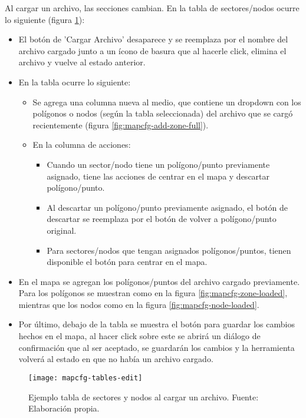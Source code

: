 Al cargar un archivo, las secciones cambian. En la tabla de sectores/nodos ocurre lo siguiente (figura \ref{fig:mapcfg-tables-edit-exameple}):

\begin{itemize}
    \item El botón de 'Cargar Archivo' desaparece y se reemplaza por el nombre del archivo cargado junto a un ícono de basura que al hacerle click, elimina el archivo y vuelve al estado anterior.
    \item En la tabla ocurre lo siguiente:
    \begin{itemize}
        \item Se agrega una columna nueva al medio, que contiene un dropdown con los polígonos o nodos (según la tabla seleccionada) del archivo que se cargó recientemente (figura \ref{fig:mapcfg-add-zone-full}).
        \item En la columna de acciones:
        \begin{itemize}        
            \item Cuando un sector/nodo tiene un polígono/punto previamente asignado, tiene las acciones de centrar en el mapa y descartar polígono/punto.
            \item Al descartar un polígono/punto previamente asignado, el botón de descartar se reemplaza por el botón de volver a polígono/punto original.
            \item Para sectores/nodos que tengan asignados polígonos/puntos, tienen disponible el botón para centrar en el mapa.
        \end{itemize}
    \end{itemize}
    \item En el mapa se agregan los polígonos/puntos del archivo cargado previamente. Para los polígonos se muestran como en la figura \ref{fig:mapcfg-zone-loaded}, mientras que los nodos como en la figura \ref{fig:mapcfg-node-loaded}.
    \item Por último, debajo de la tabla se muestra el botón para guardar los cambios hechos en el mapa, al hacer click sobre este se abrirá un diálogo de confirmación que al ser aceptado, se guardarán los cambios y la herramienta volverá al estado en que no había un archivo cargado.
\end{itemize}

\begin{figure}[H]
	\centering
	\texttt{[image: mapcfg-tables-edit]}
	\caption{\label{fig:mapcfg-tables-edit-exameple} Ejemplo tabla de sectores y nodos al cargar un archivo. Fuente: Elaboración propia.}
\end{figure}

